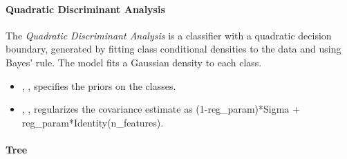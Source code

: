 \paragraph{Quadratic Discriminant Analysis}
\label{QDA}

The \textit{Quadratic Discriminant Analysis} is a classifier with a quadratic
decision boundary, generated by fitting class conditional densities to the data
and using Bayes' rule.
%
The model fits a Gaussian density to each class.

\begin{itemize}
  \item {}, ,
  specifies the priors on the classes.
  \item {}, , regularizes the
  covariance estimate as (1-reg\_param)*Sigma +
  reg\_param*Identity(n\_features).
\end{itemize}

\paragraph{Tree}
\label{tree}

